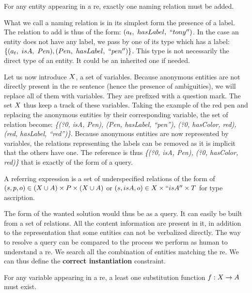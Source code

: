 \begin{theorem} 
\label{the:parlance_need}
For any entity appearing in a \acrshort{re}, exactly one naming relation must be added.
\end{theorem}

What we call a naming relation is in its simplest form the presence of a label. The relation to add is thus of the form: $(a_t,\ hasLabel,\ ``tony'')$. In the case an entity does not have any label, we pass by one of its type which has a label: $\{(\indiv_t,\ isA,\ Pen), (Pen,\ hasLabel,\ ``pen'')\}$. This type is not necessarily the direct type of an entity. It could be an inherited one if needed.

Let us now introduce $X$, a set of variables. Because anonymous entities are not directly present in the \acrshort{re} sentence (hence the presence of ambiguities), we will replace all of them with variables. They are prefixed with a question mark. The set $X$ thus keep a track of these variables. Taking the example of the red pen and replacing the anonymous entities by their corresponding variable, the set of relation become: \textit{\{(?0, isA, Pen), (Pen, hasLabel, ``pen''), (?0, hasColor, red), (red,  hasLabel, ``red'')\}}. Because anonymous entities are now represented by variables, the relations representing the labels can be removed as it is implicit that the others have one. The reference is thus \textit{\{(?0, isA, Pen), (?0, hasColor, red)\}} that is exactly of the form of a \sparql{} query.

\begin{definition}
A referring expression is a set of underspecified relations of the form of $(s, p, o) \in (X \cup A) \times P \times (X \cup A)$ or $(s, isA, o) \in X \times ``isA'' \times T$ for type ascription.
\end{definition}

The form of the wanted solution would thus be as a \sparql{} query. It can easily be built from a set of relations. All the content information are present in it, in addition to the representation that some entities can not be verbalized directly. The way to resolve a \sparql{} query can be compared to the process we perform as human to understand a \acrshort{re}. We search all the combination of entities matching the \acrshort{re}. We can thus define the \textbf{correct instantiation} constraint.

\begin{theorem} 
\label{the:correct_intance}
For any variable appearing in a \acrshort{re}, a least one substitution function $f: X \rightarrow A$ must exist.
\end{theorem}


